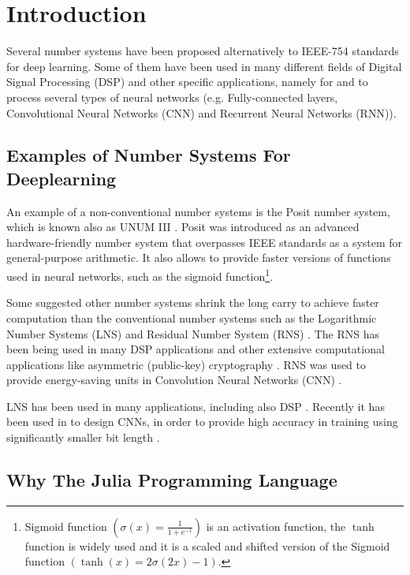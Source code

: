 \section{Introduction}

Several number systems have been proposed alternatively to IEEE-754 standards \cite{754} for deep learning. Some of them have been used in many different fields of Digital Signal Processing (DSP) and other specific applications, namely for and to process several types of neural networks (e.g. Fully-connected layers, Convolutional Neural Networks (CNN) and Recurrent Neural Networks (RNN)).

\subsection{Examples of Number Systems For Deeplearning}

An example of a non-conventional number systems is the Posit number system, which is known also as UNUM III \cite{Gustafson2017}. Posit was introduced as an advanced hardware-friendly number system that overpasses IEEE standards as a system for general-purpose arithmetic. It also allows to provide faster versions of functions used in neural networks, such as the sigmoid function\footnote{Sigmoid function $\left(\sigma(x) = \frac{1}{1 + e^{-1}}\right)$ is an activation function, the $\tanh$ function is widely used and it is a scaled and shifted version of the Sigmoid function $\left(\tanh(x) = 2 \sigma(2x) -1\right)$.}.

Some suggested other number systems shrink the long carry to achieve faster computation than the conventional number systems such as the Logarithmic Number Systems (LNS) \cite{Kingsbury1971} and Residual Number System (RNS) \cite{Garner1959}. The RNS has been being used in many DSP applications \cite{Cardarilli2007,Chaves2003,Claudio1995,DiClaudio1990,Jullien1987} and other extensive computational applications like asymmetric (public-key) cryptography \cite{Sousa2016, Asif2018a, Hizzani2019}. RNS was used to provide energy-saving units in Convolution Neural Networks (CNN) \cite{Samimi2020}.

LNS \cite{Kingsbury1971,Alexopoulos1975,Lee1977} has been used in many applications, including also DSP \cite{Dimitrov2001,Lewis1995}. Recently it has been used in to design CNNs, in order to provide high accuracy in training using significantly smaller bit length \cite{Miyashita2016,Juang2019}.

\subsection{Why The Julia Programming Language}


